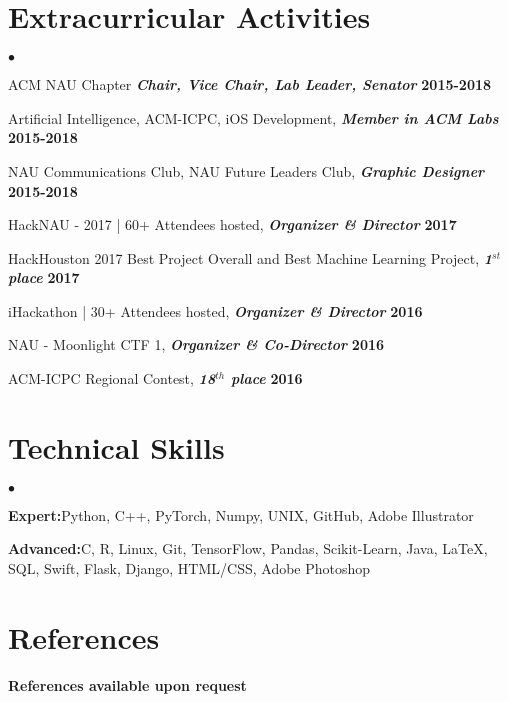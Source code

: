 \documentclass[margin,line]{res}
\newenvironment{list2}{
  \begin{list}{$\bullet$}{%
      \setlength{\itemsep}{0in}
      \setlength{\parsep}{0in} \setlength{\parskip}{0in}
      \setlength{\topsep}{0in} \setlength{\partopsep}{0in} 
      \setlength{\leftmargin}{0.2in}}}{\end{list}}
\begin{document}
\begin{resume}
\section{\sc Extracurricular Activities}
\begin{list2}
\item ACM NAU Chapter {\em \textbf{Chair, Vice Chair, Lab Leader, Senator}} \hfill {\bf 2015-2018}
\item Artificial Intelligence, ACM-ICPC, iOS Development, {\em \textbf{Member in ACM Labs}} \hfill {\bf 2015-2018}
\item NAU Communications Club, NAU Future Leaders Club, {\em \textbf{Graphic Designer}} \hfill  {\bf 2015-2018}
\item HackNAU - 2017 | 60+ Attendees hosted, {\em \textbf{Organizer \& Director}} \hfill {\bf 2017}
\item HackHouston 2017 Best Project Overall and Best Machine Learning Project, {\em \textbf{1$^{st}$ place}} \hfill  {\bf 2017}
\item iHackathon | 30+ Attendees hosted, {\em \textbf{Organizer \& Director}} \hfill {\bf 2016} 
\item NAU - Moonlight CTF 1, {\em \textbf{Organizer \& Co-Director}} \hfill {\bf 2016}
\item ACM-ICPC Regional Contest, {\em \textbf{18$^{th}$ place}} \hfill  {\bf 2016}
\end{list2}

\section{\sc Technical Skills} 
\begin{list2}
\item{\textbf{Expert:}\space Python, C++, PyTorch, Numpy, UNIX, GitHub, Adobe Illustrator}
\item{\textbf{Advanced:}\space C, R, Linux, Git, TensorFlow, Pandas, Scikit-Learn, Java, \LaTeX, SQL, Swift, Flask, Django, HTML/CSS, Adobe Photoshop}
\end{list2}

\section{\sc References} 
{\bf References available upon request}


\end{resume}
\end{document}
